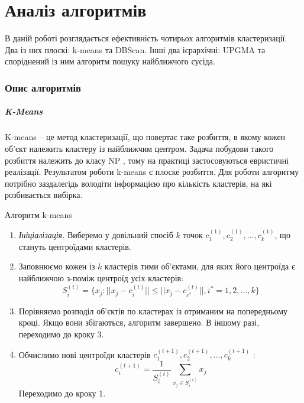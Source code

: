 \chapter {Аналіз алгоритмів}

    В даній роботі розглядається ефективність чотирьох алгоритмів кластеризації. Два із них плоскі: k-means та DBScan. Інші два ієрархічні: UPGMA та споріднений із ним алгоритм пошуку найближчого сусіда.

\subsection {Опис алгоритмів}
    \paragraph {K-Means}
        K-means -- це метод кластеризації, що повертає таке розбиття, в якому кожен об'єкт належить кластеру із найближчим центром. Задача побудови такого розбиття належить до класу NP \cite{KmeansNpHard}, тому на практиці застосовуються евристичні реалізації.
        Результатом роботи k-means є плоске розбиття. Для роботи алгоритму потрібно заздалегідь володіти інформацією про кількість кластерів, на які розбивається вибірка.
        \begin{algorithm}
            \caption {Алгоритм k-means}
            \begin{enumerate}
                \item[ ] \emph {Ініціалізація.}
                    Виберемо у довільний спосіб $k$ точок $c_1^{(1)}, c_2^{(1)}, ..., c_k^{(1)}$, що стануть центроїдами кластерів.
                \item
                    Заповнюємо кожен із $k$ кластерів тими об'єктами, для яких його центроїда є найближчою з-поміж центроїд усіх кластерів:
                    \[
                        S_i^{(t)} = \{x_j : ||x_j - c_i^{(t)}|| \leq ||x_j - c_{c^*}^{(t)}||, 
                        i^* = 1, 2, ..., k\}
                    \]
                \item
                    Порівняємо розподіл об'єктів по кластерах із отриманим на попередньому кроці.
                    Якщо вони збігаються, алгоритм завершено. В іншому разі, переходимо до кроку 3.
                \item
                    Обчислимо нові центроїди кластерів $c_1^{(t+1)}, c_2^{(t+1)}, ..., c_k^{(t+1)}$ :
                    \[
                        c_i^{(t+1)} = \frac{1} {S_i^{(t)}} \sum_{x_j \in S_i^{(t)}} x_j
                    \]
                    Переходимо до кроку 1.                        
            \end{enumerate}
        \end{algorithm}
        
